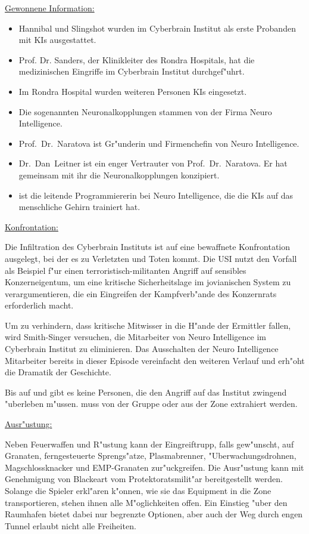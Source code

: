 \begin{remarks}
	\underline{Gewonnene Information:}
	
	\begin{itemize}
		\item Hannibal und Slingshot wurden im Cyberbrain Institut als erste Probanden mit KIs ausgestattet.
		\item Prof. Dr. Sanders, der Klinikleiter des Rondra Hospitals, hat die medizinischen Eingriffe im Cyberbrain Institut 
			durchgef"uhrt.
		\item Im Rondra Hospital wurden weiteren Personen KIs eingesetzt.
		\item Die sogenannten Neuronalkopplungen stammen von der Firma Neuro Intelligence.
		\item Prof.~Dr.~Naratova ist Gr"underin und Firmenchefin von Neuro Intelligence.
		\item Dr.~Dan~Leitner ist ein enger Vertrauter von Prof.~Dr.~Naratova. Er hat gemeinsam mit ihr die Neuronalkopplungen konzipiert.
		\item \ml{} ist die leitende Programmiererin bei Neuro Intelligence, die die KIs auf das menschliche Gehirn trainiert hat.
	\end{itemize}	 

	\underline{Konfrontation:}

	Die Infiltration des Cyberbrain Instituts ist auf eine bewaffnete Konfrontation ausgelegt, bei der es zu Verletzten und Toten kommt. Die USI nutzt den Vorfall als Beispiel f"ur einen terroristisch-militanten Angriff auf sensibles Konzerneigentum, um eine kritische Sicherheitslage im jovianischen System zu verargumentieren, die ein Eingreifen der Kampfverb"ande des Konzernrats erforderlich macht.

	Um zu verhindern, dass kritische Mitwisser in die H"ande der Ermittler fallen, wird Smith-Singer versuchen, die Mitarbeiter von Neuro Intelligence im Cyberbrain Institut zu eliminieren. Das Ausschalten der Neuro Intelligence Mitarbeiter bereits in dieser Episode vereinfacht den weiteren Verlauf und erh"oht die Dramatik der Geschichte.
	
	Bis auf \ml{} und \xl{} gibt es keine Personen, die den Angriff auf das Institut zwingend "uberleben m"ussen. \ml{} muss von der Gruppe oder \xl{} aus der Zone extrahiert werden.
\end{remarks}

\begin{remarks}
	\underline{Ausr"ustung:}

	Neben Feuerwaffen und R"ustung kann der Eingreiftrupp, falls gew"unscht, auf Granaten, ferngesteuerte Sprengs"atze, Plasmabrenner, "Uberwachungsdrohnen, Magschlossknacker und EMP-Granaten zur"uckgreifen. Die Ausr"ustung kann mit Genehmigung von Blackeart vom Protektoratsmilit"ar bereitgestellt werden. Solange die Spieler erkl"aren k"onnen, wie sie das Equipment in die Zone transportieren, stehen ihnen alle M"oglichkeiten offen. Ein Einstieg "uber den Raumhafen bietet dabei nur begrenzte Optionen, aber auch der Weg durch engen Tunnel erlaubt nicht alle Freiheiten.
\end{remarks}
